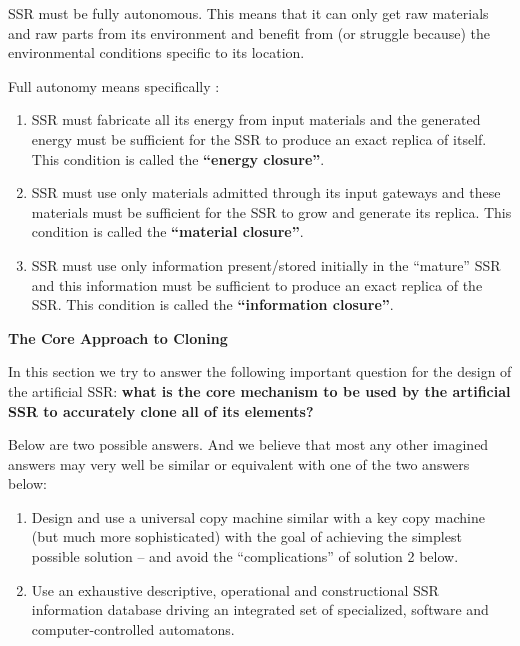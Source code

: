 \documentclass[letterpaper]{article}
\begin{document}
SSR must be fully autonomous. This means that it can only get raw
materials and raw parts from its environment and benefit from (or
struggle because) the environmental conditions specific to its
location.

Full autonomy means specifically :


\bigskip

\begin{enumerate}
\item SSR must fabricate all its energy from input materials and the
generated energy must be sufficient for the SSR to produce an exact
replica of itself. This condition is called the \textbf{“energy
closure”}. 
\item SSR must use only materials admitted through its input gateways
and these materials must be sufficient for the SSR to grow and generate
its replica. This condition is called the \textbf{“material closure”}. 
\item SSR must use only information present/stored initially in the
“mature” SSR and this information must be sufficient to produce an
exact replica of the SSR. This condition is called the
\textbf{“information closure”}.
\end{enumerate}

\bigskip

{\bfseries
\hypertarget{RefHeading3118306210128}{}The Core Approach to Cloning}


\bigskip

In this section we try to answer the following important question for
the design of the artificial SSR: \textbf{what is the core mechanism to
be used by the artificial SSR to accurately clone all of its elements?}


\bigskip

Below are two possible answers. And we believe that most any other
imagined answers may very well be similar or equivalent with one of the
two answers below:


\bigskip

\begin{enumerate}
\item Design and use a universal copy machine similar with a key copy
machine (but much more sophisticated) with the goal of achieving the
simplest possible solution – and avoid the “complications” of solution
2 below.
\item Use an exhaustive descriptive, operational and constructional SSR
information database driving an integrated set of specialized, software
and computer-controlled automatons.
\end{enumerate}
\end{document}
